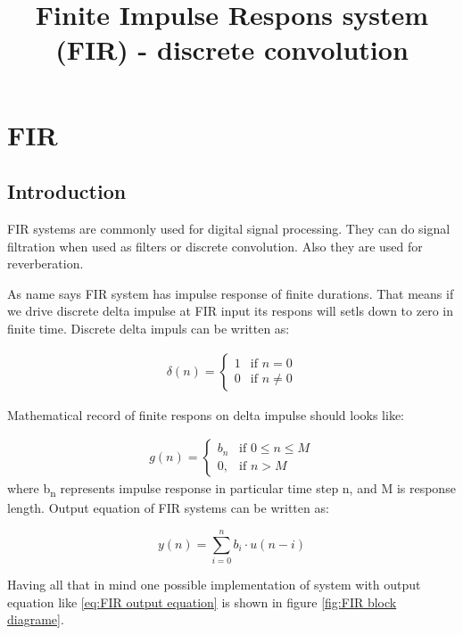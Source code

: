 \documentclass[a4paper, 12pt]{article}
\begin{document}
\title{Finite Impulse Respons system (FIR) - discrete convolution}
\date{}
\maketitle

\section{FIR}
\subsection{Introduction}

FIR systems are commonly used for digital signal processing. They can do signal filtration when used as filters or discrete convolution. Also they are used for reverberation.

As name says FIR system has impulse response of finite durations. That means if we drive discrete delta impulse at FIR input its respons will setls down to zero in finite time. Discrete delta impuls can be written as:

\begin{align}
	\delta(n) = 
	\left\{
		\begin{array}{ll}
			1 & \mbox{if } n = 0 \\
			0 & \mbox{if } n \neq 0
		\end{array}
	\right.		
\end{align}

Mathematical record of finite respons on delta impulse should looks like:

\begin{align}
	g(n) =
	\left\{
		\begin{array}{ll}
			b_n & \mbox{if } 0 \leq n \leq M \\
			0, & \mbox{if } n > M		
		\end{array}
	\right.
\end{align} where b\textsubscript{n} represents impulse response in particular time step n, and M is response length. Output equation of FIR systems can be written as:

\begin{equation}\label{eq:FIR output equation}
y(n) = \sum_{i=0}^{n}{b_{i} \cdot u(n-i)}
\end{equation}

Having all that in mind one possible implementation of system with output equation like \eqref{eq:FIR output equation} is shown in figure \ref{fig:FIR block diagrame}.
\end{document}
